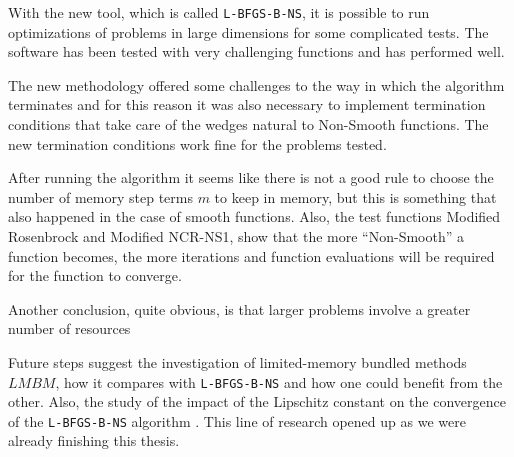 With the new tool, which is called \texttt{L-BFGS-B-NS}, it is possible to run optimizations of problems in large dimensions for some complicated tests. The software has been tested with very challenging functions and has performed well.

The new methodology offered some challenges to the way in which the algorithm terminates and for this reason it was also necessary to implement termination conditions that take care of the wedges natural to Non-Smooth functions. The new termination conditions work fine for the problems tested.

After running the algorithm it seems like there is not a good rule to choose the number of memory step terms $m$ to keep in memory, but this is something that also happened in the case of smooth functions. Also, the test functions Modified Rosenbrock and Modified NCR-NS1, show that the more ``Non-Smooth'' a function becomes, the more iterations and function evaluations will be required for the function to converge.

Another conclusion, quite obvious, is that larger problems involve a greater number of resources

Future steps suggest the investigation of limited-memory bundled methods $LMBM$, how it compares with \texttt{L-BFGS-B-NS} and how one could benefit from the other. Also, the study of the impact of the Lipschitz constant on the convergence of the \texttt{L-BFGS-B-NS} algorithm \citep{QJ:QJ935}. This line of research opened up as we were already finishing this thesis.

